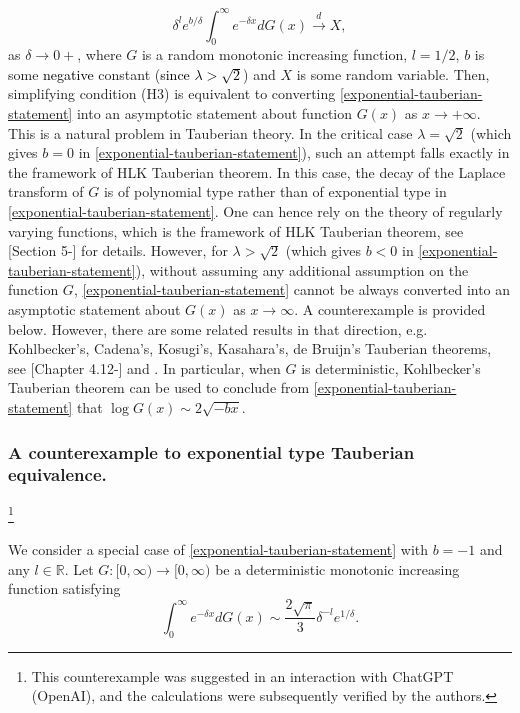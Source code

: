 \documentclass[a4paper,reqno]{amsart}%
\newcommand{\1}{\mathbf 1}
\theoremstyle{mine}
\numberwithin{theorem}{section}
\numberwithin{equation}{section}
\theoremstyle{remark}
\begin{document}
\begin{equation}\label{exponential-tauberian-statement}
    \delta^{l} e^{b/\delta} \int_0^\infty e^{-\delta x} dG(x) \overset{d}{\to} X,
\end{equation}
as $\delta \to 0+$, where $G$ is a random monotonic increasing function, $l=1/2$, $b$ is some \textcolor{black}{negative} constant (\textcolor{black}{since $\lambda>\sqrt 2$}) and $X$ is some random variable. Then, simplifying condition (H3) is equivalent to converting \eqref{exponential-tauberian-statement} into an asymptotic statement about function $G(x)$ as $x\to + \infty$. This is a natural problem in Tauberian theory. In the critical case $\lambda = \sqrt{2}$ (which gives $b=0$ in \eqref{exponential-tauberian-statement}), such an attempt falls exactly in the framework of HLK Tauberian theorem. In this case, the decay of the Laplace transform of $G$ is of polynomial type rather than of exponential type in \eqref{exponential-tauberian-statement}. One can hence rely on the theory of regularly varying functions, which is the framework of HLK Tauberian theorem, see [Section 5-\cite{Shekhar_Domain}] for details. However, for $\lambda >\sqrt{2}$ (which gives $b<0$ in \eqref{exponential-tauberian-statement}), without assuming any additional assumption on the function $G$, \eqref{exponential-tauberian-statement} cannot be always converted into an asymptotic statement about $G(x)$ as $x\to \infty$. A counterexample is provided below. However, there are some related results in that direction, e.g. Kohlbecker's, Cadena's, Kosugi's, Kasahara's, de Bruijn's Tauberian theorems, see [Chapter 4.12-\cite{Bingham_Regular_variation}] and \cite{cadena2015note, Nobuko_Tauberian}. In particular, when $G$ is deterministic, Kohlbecker's Tauberian theorem can be used to conclude from \eqref{exponential-tauberian-statement} that $\log G(x) \sim 2 \sqrt{-bx}$. 

\subsubsection{A counterexample to exponential type Tauberian equivalence.}\label{rem:tauberian}
\footnote{This counterexample was suggested in an interaction with ChatGPT (OpenAI), and the calculations were subsequently verified by the authors.}

We consider a special case of \eqref{exponential-tauberian-statement} with $b=-1$ and any $l \in \mathbb{R}$. Let $G: [0,\infty) \to [0,\infty)$ be a deterministic monotonic increasing function satisfying 
\begin{equation}\label{exp-tau-statement-2}
    \int_0^\infty e^{-\delta x} dG(x) \sim \frac{2\sqrt{\pi}}{3} \delta^{-l}e^{1/\delta}.
\end{equation}
\end{document}
